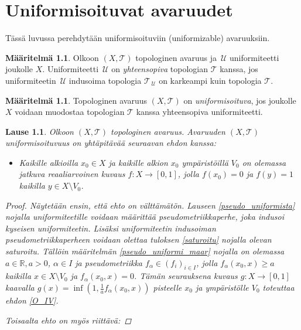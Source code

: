 \documentclass[12pt,a4paper,leqno]{report}
\newcommand{\R}{\mathbb{R}}
\newcommand{\U}{\,\mathcal{U}}
\newcommand{\T}{\mathcal{T}}
\theoremstyle{plain}
\newtheorem{lause}[equation]{Lause}
\newtheorem{kor}[equation]{Korollaari}
\theoremstyle{definition}
\newtheorem{maar}[equation]{Määritelmä}
\theoremstyle{remark}
\begin{document}
\chapter{Uniformisoituvat avaruudet}
Tässä luvussa perehdytään uniformisoituviin (uniformizable) avaruuksiin. 
\begin{maar}
Olkoon $(X,\T)$ topologinen avaruus ja 
$\U$ uniformiteetti joukolle $X$. 
Uniformiteetti $\U$ on \emph{yhteensopiva} topologian $\T$ kanssa, 
jos uniformiteetin $\U$ indusoima topologia 
$\T_{\U}$ on karkeampi kuin topologia $\T$.
\end{maar}
%
\begin{maar}
Topologinen avaruus $(X,\T)$ on \emph{uniformisoituva}, jos joukolle $X$ voidaan muodostaa topologian $\T$ kanssa yhteensopiva uniformiteetti.
\end{maar}
\begin{lause}
Olkoon $(X,\T)$ topologinen avaruus.
Avaruuden $(X,\T)$ uniformisoituvuus on yhtäpitävää seuraavan ehdon kanssa:
\begin{itemize}
\item\label{O_IV} Kaikille alkioilla $x_0\in X$ ja kaikille 
alkion $x_0$ ympäristöillä $V_0$ on olemassa jatkuva 
reaaliarvoinen kuvaus $f\colon X\rightarrow [0,1]$, 
jolla $f(x_0)=0$ ja $f(y)=1$ kaikilla $y\in X\setminus V_0$.
\end{itemize}
\begin{proof}
Näytetään ensin, että ehto on välttämätön. 
Lauseen \ref{pseudo_uniformista} nojalla uniformiteetille voidaan 
määrittää pseudometriikkaperhe, joka indusoi kyseisen uniformiteetin. 
Lisäksi uniformiteetin indusoiman pseudometriikkaperheen voidaan olettaa tuloksen \ref{saturoitu} nojalla olevan saturoitu. 
Tällöin määritelmän \ref{pseudo_uniformi_maar} nojalla on olemassa $ a\in\R,a>0$, $\alpha\in I$ 
ja pseudometriikka $f_\alpha\in (f_i)_{i\in I}$, 
jolla $f_\alpha (x_0,x)\geq a$ kaikilla $x\in X\setminus V_0$ ja $f_\alpha(x_0,x)=0$. 
Tämän seurauksena kuvaus $g\colon X\to [0,1]$ kaavalla $g(x)=\inf \left( 1,\frac{1}{a}f_\alpha(x_0,x) \right)$ 
pisteelle $x_0$ ja ympäristölle $V_0$ toteuttaa ehdon \ref{O_IV}.

Toisaalta ehto on myös riittävä:
\end{proof}
\end{lause}
%
%
\end{document}
